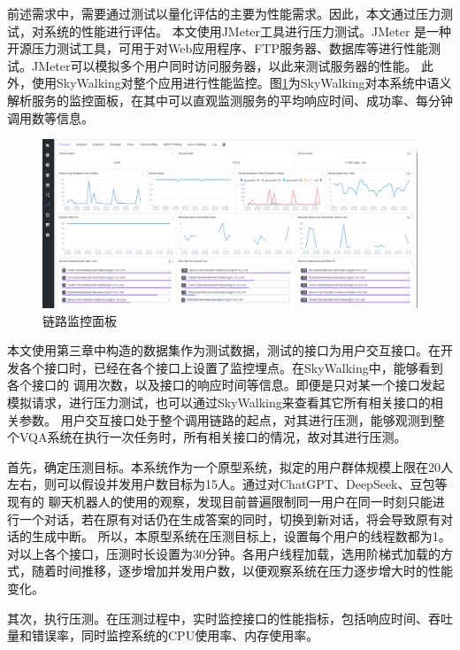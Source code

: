 前述需求中，需要通过测试以量化评估的主要为性能需求。因此，本文通过压力测试，对系统的性能进行评估。
本文使用JMeter工具进行压力测试。JMeter 是一种开源压力测试工具，可用于对Web应用程序、FTP服务器、数据库等进行性能测试。JMeter可以模拟多个用户同时访问服务器，以此来测试服务器的性能。
此外，使用SkyWalking对整个应用进行性能监控。图\ref{fig:SkyWalking}为SkyWalking对本系统中语义解析服务的监控面板，在其中可以直观监测服务的平均响应时间、成功率、每分钟调用数等信息。
\begin{figure}[h]
    \centering
    \includegraphics[width=\textwidth]{figures/SkyWalking.png}
    \caption{链路监控面板}
    \label{fig:SkyWalking}
\end{figure}

本文使用第三章中构造的数据集作为测试数据，测试的接口为用户交互接口。在开发各个接口时，已经在各个接口上设置了监控埋点。在SkyWalking中，能够看到各个接口的
调用次数，以及接口的响应时间等信息。即便是只对某一个接口发起模拟请求，进行压力测试，也可以通过SkyWalking来查看其它所有相关接口的相关参数。
用户交互接口处于整个调用链路的起点，对其进行压测，能够观测到整个VQA系统在执行一次任务时，所有相关接口的情况，故对其进行压测。

首先，确定压测目标。本系统作为一个原型系统，拟定的用户群体规模上限在20人左右，则可以假设并发用户数目标为15人。通过对ChatGPT、DeepSeek、豆包等现有的
聊天机器人的使用的观察，发现目前普遍限制同一用户在同一时刻只能进行一个对话，若在原有对话仍在生成答案的同时，切换到新对话，将会导致原有对话的生成中断。
所以，本原型系统在压测目标上，设置每个用户的线程数都为1。
对以上各个接口，压测时长设置为30分钟。各用户线程加载，选用阶梯式加载的方式，随着时间推移，逐步增加并发用户数，以便观察系统在压力逐步增大时的性能变化。

其次，执行压测。在压测过程中，实时监控接口的性能指标，包括响应时间、吞吐量和错误率，同时监控系统的CPU使用率、内存使用率。

